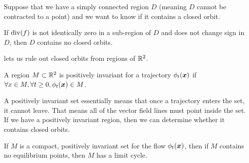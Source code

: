 Suppose that we have a simply connected region $D$ (meaning $D$ cannot be
contracted to a point) and we want to know if it contains a closed orbit.
\begin{theorem}
	If $\operatorname*{div}(f)$ is not identically zero in a sub-region of $D$ and does not
	change sign in $D$, then $D$ contains no closed orbits.
	\label{thm:bendixons}
\end{theorem}
 lets us rule out closed orbits from regions of
$\mathbb{R}^2$.
\begin{definition}
	A region $M \subset \mathbb{R}^2$ is positively invariant for a trajectory
	$\phi_t(\boldsymbol{x})$ if $\forall x\in M, \forall t \geq 0, \phi_t(\boldsymbol{x}) \in M$.
	\label{defn:positive-invariance}
\end{definition}
A positively invariant set essentially means that once a trajectory enters the
set, it cannot leave. That means all of the vector field lines must point inside
the set.
If we have a positively invariant region, then we can determine whether it
contains closed orbits.
\begin{theorem}
	If $M$ is a compact, positively invariant set for the flow $\phi_t(\boldsymbol{x})$,
	then if $M$ contains no equilibrium points, then $M$ has a limit cycle.
	\label{thm:poincare-bendixson}
\end{theorem}


